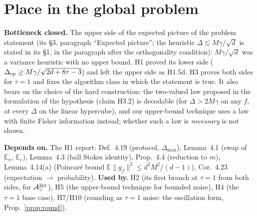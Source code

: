 \documentclass[11pt,a4paper]{article}
\numberwithin{equation}{section}
\theoremstyle{definition}
\theoremstyle{remark}
\newcommand{\E}{\mathbb E}\newcommand{\R}{\mathbb R}\newcommand{\Z}{\mathbb Z}\newcommand{\Prob}{\mathbb P}
\newcommand{\Dmax}{\Delta_{\max}}\newcommand{\Dcp}{\Delta_{\rm cp}}\newcommand{\Dlow}{\Delta_{\rm low}}
\begin{document}
\section{Place in the global problem}\label{sec:place}
\textbf{Bottleneck closed.} The upper side of the expected picture of the problem statement (its \S3, paragraph ``Expected picture''; the heuristic $\Delta\lesssim M\gamma/\sqrt d$ is stated in its \S1, in the paragraph after the orthogonality condition): $M\gamma/\sqrt d$ was a variance heuristic with no upper bound. H1 proved its lower side ($\Dcp\ge M\gamma/\sqrt{2d+8\tau-3}$) and left the upper side as H1.5d. H3 proves both sides for $\tau=1$ and fixes the algorithm class in which the statement is true. It also bears on the choice of the hard construction: the two-valued law proposed in the formulation of the hypothesis (claim H3.2) is decodable (for $\Delta>2M\gamma$ on any $f$, at every $\Delta$ on the linear hypercube), and our upper-bound technique uses a law with finite Fisher information instead; whether such a law is \emph{necessary} is not shown.

\textbf{Depends on.} The H1 report: Def.~4.19 (protocol, $\Dmax$), Lemma~4.1 (swap of $\E_\pi$, $\E_e$), Lemma~4.3 (ball Stokes identity), Prop.~4.4 (reduction to $m$), Lemma~4.14(a) (Poincar\'e bound $\E\|g_f\|^2\le d^2M^2/(d-1)$), Cor.~4.23 (expectation $\to$ probability). \textbf{Used by.} H2 (its first branch at $\tau=1$ from both sides, for $\mathcal A^{\rm 2pt}_\gamma$), H5 (the upper-bound technique for bounded noise), H4 (the $\tau=1$ base case), H7/H10 (rounding as $\tau=1$ noise: the oscillation form, Prop.~\ref{prop:round}).
\end{document}
